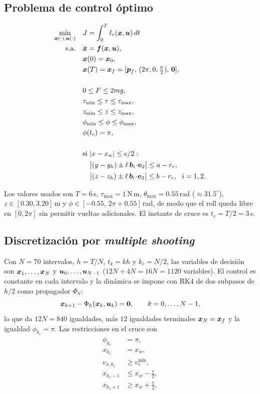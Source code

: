 \subsection{Problema de control óptimo}
\begin{equation*}
\begin{aligned}
\min_{\bm{x}(\cdot),\bm{u}(\cdot)}\quad & J=\int_0^T \ell_c(\bm{x},\bm{u})\,dt\\
\text{s.a.}\quad & \dot{\bm{x}}=\bm f(\bm{x},\bm{u}),\\
& \bm{x}(0)=\bm{x}_0,\\
& \bm{x}(T)=\bm{x}_f=[\bm{p}_f,\,(2\pi,0,\tfrac{\pi}{2}),\,\mathbf 0],\\
& \\
& 0\le F\le 2mg,\\
& \tau_{\min}\le \tau\le \tau_{\max},\\
& z_{\min}\le z\le z_{\max},\\
& \phi_{\min}\le\phi\le\phi_{\max},\\
& \phi(t_c)=\pi,\\
& \\
& \text{si }|x-x_w|\le e/2:\\
& \quad \big|(y-y_h)\pm\ell\,\bm b_i\!\cdot\!\mathbf e_2\big|\le a-r_r,\\
& \quad \big|(z-z_h)\pm\ell\,\bm b_i\!\cdot\!\mathbf e_3\big|\le b-r_r,\ \ i=1,2.
\end{aligned}
\end{equation*}

Los valores usados son $T=6$\,s, $\tau_{\max}=1$\,N\,m, $\theta_{\max}=0.55$\,rad ($\approx31.5^\circ$), $z\in[0.30,3.20]$\,m y $\phi\in[-0.55,\,2\pi+0.55]$\,rad, de modo que el roll queda libre en $[0,2\pi]$ sin permitir vueltas adicionales. El instante de cruce es $t_c=T/2=3$\,s.

\subsection{Discretización por \textit{multiple shooting}}
Con $N=70$ intervalos, $h=T/N$, $t_k=kh$ y $k_c=N/2$, las variables de decisión son $\bm{x}_1,\dots,\bm{x}_N$ y $\bm{u}_0,\dots,\bm{u}_{N-1}$ ($12N+4N=16N=1120$ variables). El control es constante en cada intervalo y la dinámica se impone con RK4 de dos subpasos de $h/2$ como propagador $\Phi_h$:
\begin{equation*}
\bm{x}_{k+1}-\Phi_h(\bm{x}_k,\bm{u}_k)=\mathbf 0,\qquad k=0,\dots,N-1,
\end{equation*}
lo que da $12N=840$ igualdades, más $12$ igualdades terminales $\bm{x}_N=\bm{x}_f$ y la igualdad $\phi_{k_c}=\pi$. Las restricciones en el cruce son
\begin{align*}
\phi_{k_c}&=\pi,\\
x_{k_c}&=x_w,\\
v_{x,k_c}&\ge v_{c}^{\min},\\
x_{k_c-1}&\le x_w-\tfrac e2,\\
x_{k_c+1}&\ge x_w+\tfrac e2,
\end{align*}

